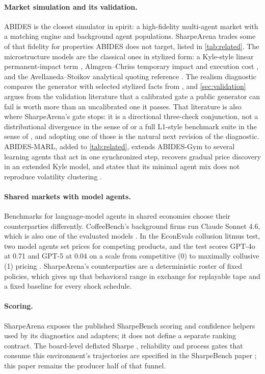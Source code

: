 \paragraph{Market simulation and its validation.} ABIDES \citep{byrd2020abides} is the closest simulator in spirit: a high-fidelity multi-agent market with a matching engine and background agent populations. SharpeArena trades some of that fidelity for properties ABIDES does not target, listed in \cref{tab:related}. The microstructure models are the classical ones in stylized form: a Kyle-style linear permanent-impact term \citep{kyle1985continuous}, Almgren--Chriss temporary impact and execution cost \citep{almgren2001optimal}, and the Avellaneda--Stoikov analytical quoting reference \citep{avellaneda2008high}. The realism diagnostic compares the generator with selected stylized facts from \citet{cont2001empirical}, and \cref{sec:validation} argues from the validation literature \citep{platt2018agent,fagiolo2019validation,lamperti2018information,vyetrenko2020getreal,nagy2025lobbench} that a calibrated gate a public generator can fail is worth more than an uncalibrated one it passes. That literature is also where SharpeArena's gate stops: it is a directional three-check conjunction, not a distributional divergence in the sense of \citet{lamperti2018information} or a full L1-style benchmark suite in the sense of \citet{nagy2025lobbench}, and adopting one of those is the natural next revision of the diagnostic. ABIDES-MARL, added to \cref{tab:related}, extends ABIDES-Gym to several learning agents that act in one synchronized step, recovers gradual price discovery in an extended Kyle model, and states that its minimal agent mix does not reproduce volatility clustering \citep[pp.~1, 18, 20]{cheridito2025abidesmarl}.

\paragraph{Shared markets with model agents.} Benchmarks for language-model agents in shared economies choose their counterparties differently. CoffeeBench's background firms run Claude Sonnet 4.6, which is also one of the evaluated models \citep[pp.~5--6]{sugiura2026coffeebench}. In the EconEvals collusion litmus test, two model agents set prices for competing products, and the test scores GPT-4o at 0.71 and GPT-5 at 0.04 on a scale from competitive (0) to maximally collusive (1) pricing \citep[pp.~60--62]{fish2026econevals}. SharpeArena's counterparties are a deterministic roster of fixed policies, which gives up that behavioral range in exchange for replayable tape and a fixed baseline for every shock schedule.

\paragraph{Scoring.} SharpeArena exposes the published SharpeBench scoring and confidence helpers used by its diagnostics and adapters; it does not define a separate ranking contract. The board-level deflated Sharpe \citep{bailey2014deflated}, reliability and process gates that consume this environment's trajectories are specified in the SharpeBench paper \citep{toca2026sharpebench}; this paper remains the producer half of that funnel.
